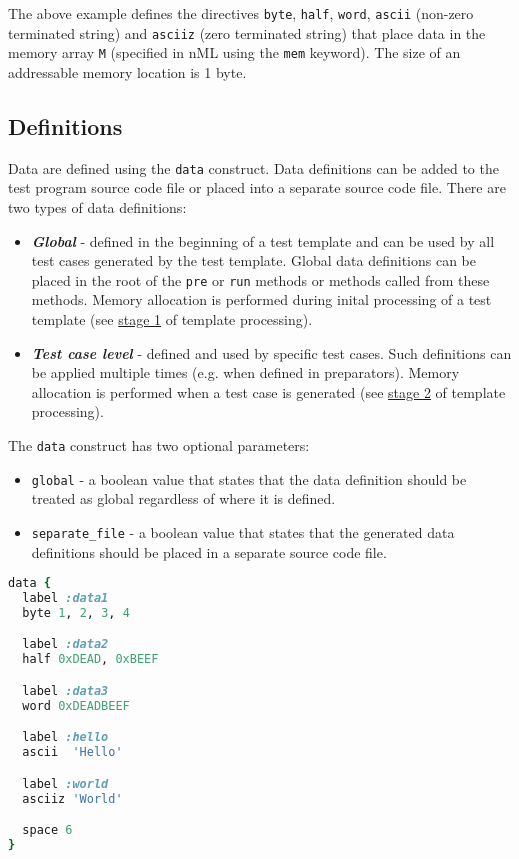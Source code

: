 \documentclass[oneside,final,12pt]{extreport}
\begin{document}
The above example defines the directives \texttt{byte}, \texttt{half}, \texttt{word},
\texttt{ascii} (non-zero terminated string) and \texttt{asciiz} (zero terminated string)
that place data in the memory array \texttt{M} (specified in nML using the \texttt{mem} keyword).
The size of an addressable memory location is 1 byte.

\subsection{Definitions}

Data are defined using the \texttt{data} construct. Data definitions can be added to the test
program source code file or placed into a separate source code file. There are two types of
data definitions:

\begin{itemize}
\item \textbf{\textit{Global}} - defined in the beginning of a test template and can be used by
      all test cases generated by the test template. Global data definitions can be placed in
      the root of the \texttt{pre} or \texttt{run} methods or methods called from these methods.
      Memory allocation is performed during inital processing of a test template (see
      \hyperref[ttp_stage_1]{stage 1} of template processing).

\item \textbf{\textit{Test case level}} - defined and used by specific test cases. Such definitions
      can be applied multiple times (e.g. when defined in preparators).
      Memory allocation is performed when a test case is generated (see
      \hyperref[ttp_stage_2]{stage 2} of template processing).
\end{itemize}

The \texttt{data} construct has two optional parameters:

\begin{itemize}
\item \texttt{global} - a boolean value that states that the data definition should be
      treated as global regardless of where it is defined.
\item \texttt{separate{\_}file} - a boolean value that states that the generated data
      definitions should be placed in a separate source code file.
\end{itemize}

\begin{lstlisting}[language=ruby]
data {
  label :data1
  byte 1, 2, 3, 4

  label :data2
  half 0xDEAD, 0xBEEF

  label :data3
  word 0xDEADBEEF

  label :hello
  ascii  'Hello'

  label :world
  asciiz 'World'

  space 6
}
\end{lstlisting}
\end{document}
